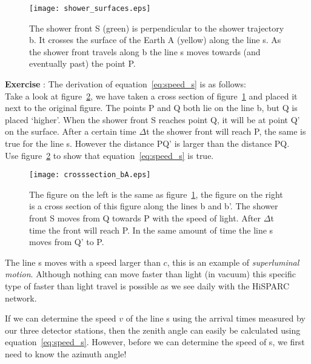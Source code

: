 \begin{figure}\begin{center}
\texttt{[image: shower\_surfaces.eps]}
\caption{The shower front S (green) is perpendicular to the shower trajectory b. It crosses the surface of the Earth A (yellow) along the line s. As the shower front travels along b the line s moves towards (and eventually past) the point P.}\label{fig:shower_surfaces.eps}
\end{center}\end{figure}

\begin{shaded}
\textbf{Exercise \theExercise {}} : The derivation of equation~\ref{eq:speed_s} is as follows: \\
Take a look at figure~\ref{fig:crosssection_BA.eps}, we have taken a cross section of figure~\ref{fig:shower_surfaces.eps} and placed it next to the original figure. The points P and Q both lie on the line b, but Q is placed `higher'. When the shower front S reaches point Q, it will be at point Q' on the surface. After a certain time $\Delta$t the shower front will reach P, the same is true for the line s. However the distance PQ' is larger than the distance PQ. \\
Use figure~\ref{fig:crosssection_BA.eps} to show that equation~\ref{eq:speed_s} is true. \end{shaded}

\begin{figure}[b]\begin{center}
\texttt{[image: crosssection\_bA.eps]}
\caption{The figure on the left is the same as figure~\ref{fig:shower_surfaces.eps}, the figure on the right is a cross section of this figure along the lines b and b'. The shower front S moves from Q towards P with the speed of light. After $\Delta$t time the front will reach P. In the same amount of time the line s moves from Q' to P.}\label{fig:crosssection_BA.eps}
\end{center}\end{figure}

The line s moves with a speed larger than $c$, this is an example of \textit{superluminal motion}. Although nothing can move faster than light (in vacuum) this specific type of faster than light travel is possible as we see daily with the HiSPARC network.

If we can determine the speed $v$ of the line s using the arrival times measured by our three detector stations, then the zenith angle can easily be calculated using equation~\ref{eq:speed_s}. However, before we can determine the speed of s, we first need to know the azimuth angle!

